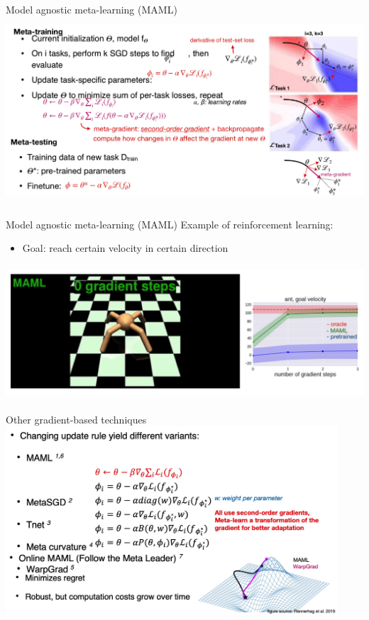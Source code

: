 \begin{frame}{Model agnostic meta-learning (MAML)}
    \centering\includegraphics[height=7cm]{image/img005323.jpg}
\end{frame}
\begin{frame}{Model agnostic meta-learning (MAML)}
    Example of reinforcement learning:
    \begin{itemize}
        \item Goal: reach certain velocity in certain direction
    \end{itemize}
    \centering\includegraphics[height=5cm]{image/img005513.jpg}
\end{frame}
\begin{frame}{Other gradient-based techniques}
    \centering\includegraphics[height=7cm]{image/img005754.jpg}
\end{frame}
